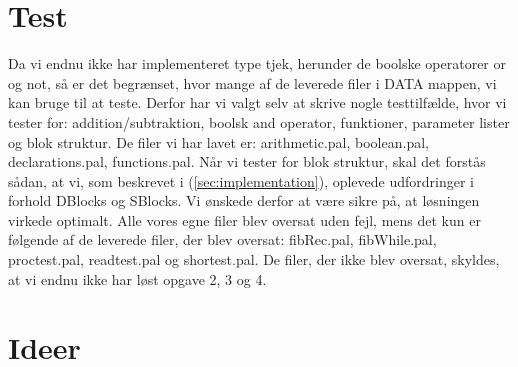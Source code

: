 \documentclass[11pt,a4paper]{article}
\begin{document}
\section*{Test}
Da vi endnu ikke har implementeret type tjek, herunder de boolske operatorer
or og not, så er det begrænset, hvor mange af de leverede filer i DATA mappen,
vi kan bruge til at teste. Derfor har vi valgt selv at skrive nogle testtilfælde,
hvor vi tester for: addition/subtraktion, boolsk and operator, funktioner,
parameter lister og blok struktur. De filer vi har lavet er: arithmetic.pal,
boolean.pal, declarations.pal, functions.pal. Når vi tester for blok struktur,
skal det forstås sådan, at vi, som beskrevet i (\ref{sec:implementation}), oplevede
udfordringer i forhold DBlocks og SBlocks. Vi ønskede derfor at være sikre på, at 
løsningen virkede optimalt. Alle vores egne filer blev oversat uden fejl, mens
det kun er følgende af de leverede filer, der blev oversat: fibRec.pal,
fibWhile.pal, proctest.pal, readtest.pal og shortest.pal. De filer, der ikke
blev oversat, skyldes, at vi endnu ikke har løst opgave 2, 3 og 4.
\section*{Ideer}
\end{document}
